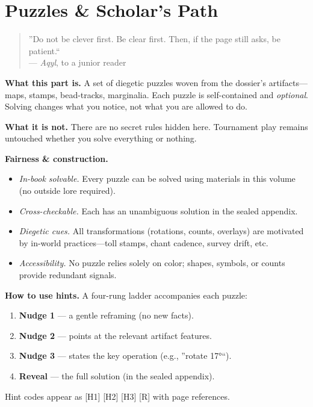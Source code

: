 \documentclass[11pt]{article}
\numberwithin{equation}{section} %
\theoremstyle{plain} %
\theoremstyle{definition} %
\theoremstyle{remark} %
\begin{document}
\section{Puzzles \& Scholar's Path}
\label{part:puzzles}

\begin{quote}\small
''Do not be clever first. Be clear first. Then, if the page still asks, be patient.``\\
\hfill --- \textit{Aqyl}, to a junior reader
\end{quote}

\noindent\textbf{What this part is.} A set of diegetic puzzles woven from the dossier's artifacts---maps, stamps, bead-tracks, marginalia. Each puzzle is self-contained and \emph{optional}. Solving changes what you notice, not what you are allowed to do.

\medskip
\noindent\textbf{What it is not.} There are no secret rules hidden here. Tournament play remains untouched whether you solve everything or nothing.

\medskip
\noindent\textbf{Fairness \& construction.}
\begin{itemize}\setlength\itemsep{0.3em}
  \item \emph{In-book solvable.} Every puzzle can be solved using materials in this volume (no outside lore required).
  \item \emph{Cross-checkable.} Each has an unambiguous solution in the sealed appendix.
  \item \emph{Diegetic cues.} All transformations (rotations, counts, overlays) are motivated by in-world practices---toll stamps, chant cadence, survey drift, etc.
  \item \emph{Accessibility.} No puzzle relies solely on color; shapes, symbols, or counts provide redundant signals.
\end{itemize}

\medskip
\noindent\textbf{How to use hints.} A four-rung ladder accompanies each puzzle:
\begin{enumerate}\setlength\itemsep{0.25em}
  \item \textbf{Nudge 1} --- a gentle reframing (no new facts).
  \item \textbf{Nudge 2} --- points at the relevant artifact features.
  \item \textbf{Nudge 3} --- states the key operation (e.g., ''rotate 17°``).
  \item \textbf{Reveal} --- the full solution (in the sealed appendix).
\end{enumerate}
Hint codes appear as \textsc{[H1] [H2] [H3] [R]} with page references.
\end{document}

